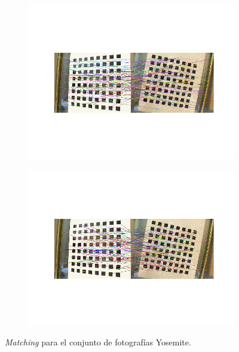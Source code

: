 \documentclass[11pt,a4paper]{article}
\begin{document}
\begin{figure}[H]
	\centering
	\begin{subfigure}[t]{\textwidth}
		\centering
		\includegraphics[scale=0.78]{img/board-bf}
	\end{subfigure}
	\begin{subfigure}[t]{\textwidth}
		\centering
		\includegraphics[scale=0.78]{img/board-lowe}
	\end{subfigure}
	\caption{\textit{Matching} para el conjunto de fotografías Yosemite.}
	\label{fig:board}
\end{figure}
\end{document}
